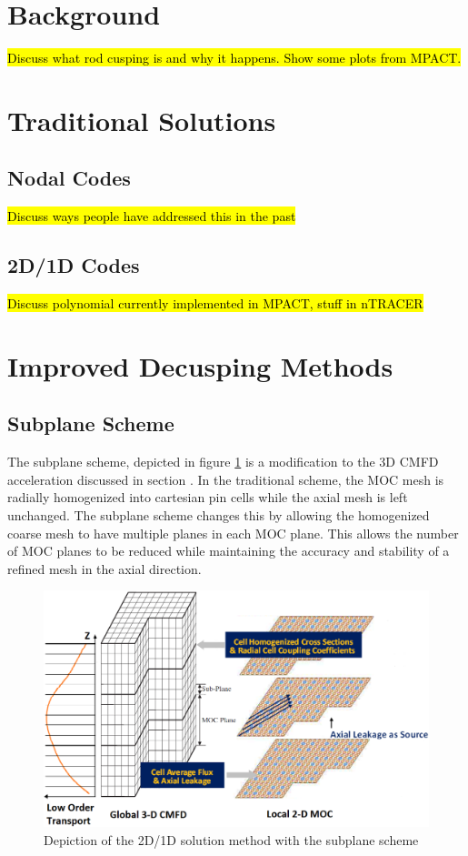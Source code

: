\section{Background}

\hl{Discuss what rod cusping is and why it happens.  Show some plots from MPACT.}

\section{Traditional Solutions}

\subsection{Nodal Codes}

\hl{Discuss ways people have addressed this in the past}

\subsection{2D/1D Codes}

\hl{Discuss polynomial currently implemented in MPACT, stuff in nTRACER}

\section{Improved Decusping Methods}

\subsection{Subplane Scheme}

The subplane scheme, depicted in figure \ref{f:subplane} is a modification to the 3D CMFD acceleration discussed in section .  In the traditional scheme, the MOC mesh is radially homogenized into cartesian pin cells while the axial mesh is left unchanged.  The subplane scheme changes this by allowing the homogenized coarse mesh to have multiple planes in each MOC plane.  This allows the number of MOC planes to be reduced while maintaining the accuracy and stability of a refined mesh in the axial direction.

\begin{figure}
\includegraphics[width=6in]{figs/2d1d-subplane.png}
\caption{Depiction of the 2D/1D solution method with the subplane scheme}\label{f:subplane}
\end{figure}

